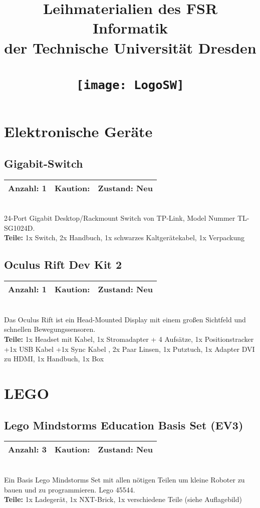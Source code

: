 \documentclass[a4paper]{article}
\newcommand{\iFSR}{FSR Informatik}
\newcommand{\infobox}[3] %
        {\par
                \begin{tabular}{| c | c | c| }
                \hline
                Anzahl: #1 & Kaution: \EUR{#2} & Zustand: #3 \\
                \hline
                \end{tabular} \\
        }
\begin{document}
\title{\bf Leihmaterialien des \iFSR \\
        der Technische Universität Dresden \\~\\
         \texttt{[image: LogoSW]}
}

\maketitle


\tableofcontents


\pagebreak

\section{Elektronische Geräte}

\subsection{Gigabit-Switch}
\infobox{1}{10}{Neu}
24-Port Gigabit Desktop/Rackmount Switch von TP-Link, Model Nummer TL-SG1024D. \\
\textbf{ Teile:} 1x Switch, 2x Handbuch, 1x schwarzes Kaltgerätekabel, 1x Verpackung

\subsection{Oculus Rift Dev Kit 2}
\infobox{1}{30}{Neu}
Das Oculus Rift ist ein Head-Mounted Display mit einem großen Sichtfeld und schnellen Bewegungssensoren. \\
\textbf{Teile:} 1x Headset mit Kabel, 1x Stromadapter + 4 Aufsätze, 1x Positionstracker +1x USB Kabel +1x Sync Kabel , 2x Paar Linsen, 1x Putztuch, 1x Adapter DVI zu HDMI, 1x Handbuch, 1x Box


\section{LEGO}

\subsection{Lego Mindstorms Education Basis Set (EV3)}
\infobox{3}{0}{Neu}
Ein Basis Lego Mindstorms Set mit allen nötigen Teilen um kleine Roboter zu bauen und zu programmieren. Lego 45544. \\
\textbf{Teile:} 1x Ladegerät, 1x NXT-Brick, 1x verschiedene Teile (siehe Auflagebild)
\end{document}
